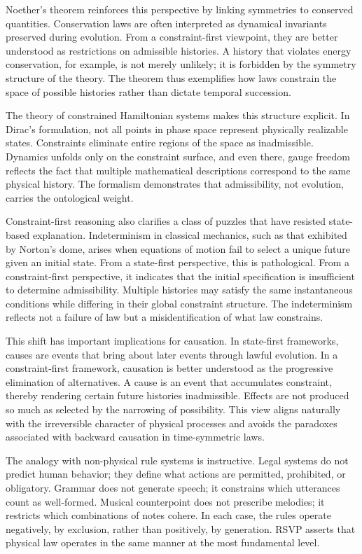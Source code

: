 \documentclass[11pt,oneside]{book}
\begin{document}
Noether’s theorem reinforces this perspective by linking symmetries to conserved quantities. Conservation laws are often interpreted as dynamical invariants preserved during evolution. From a constraint-first viewpoint, they are better understood as restrictions on admissible histories. A history that violates energy conservation, for example, is not merely unlikely; it is forbidden by the symmetry structure of the theory. The theorem thus exemplifies how laws constrain the space of possible histories rather than dictate temporal succession.

The theory of constrained Hamiltonian systems makes this structure explicit. In Dirac’s formulation, not all points in phase space represent physically realizable states. Constraints eliminate entire regions of the space as inadmissible. Dynamics unfolds only on the constraint surface, and even there, gauge freedom reflects the fact that multiple mathematical descriptions correspond to the same physical history. The formalism demonstrates that admissibility, not evolution, carries the ontological weight.

Constraint-first reasoning also clarifies a class of puzzles that have resisted state-based explanation. Indeterminism in classical mechanics, such as that exhibited by Norton’s dome, arises when equations of motion fail to select a unique future given an initial state. From a state-first perspective, this is pathological. From a constraint-first perspective, it indicates that the initial specification is insufficient to determine admissibility. Multiple histories may satisfy the same instantaneous conditions while differing in their global constraint structure. The indeterminism reflects not a failure of law but a misidentification of what law constrains.

This shift has important implications for causation. In state-first frameworks, causes are events that bring about later events through lawful evolution. In a constraint-first framework, causation is better understood as the progressive elimination of alternatives. A cause is an event that accumulates constraint, thereby rendering certain future histories inadmissible. Effects are not produced so much as selected by the narrowing of possibility. This view aligns naturally with the irreversible character of physical processes and avoids the paradoxes associated with backward causation in time-symmetric laws.

The analogy with non-physical rule systems is instructive. Legal systems do not predict human behavior; they define what actions are permitted, prohibited, or obligatory. Grammar does not generate speech; it constrains which utterances count as well-formed. Musical counterpoint does not prescribe melodies; it restricts which combinations of notes cohere. In each case, the rules operate negatively, by exclusion, rather than positively, by generation. RSVP asserts that physical law operates in the same manner at the most fundamental level.
\end{document}
